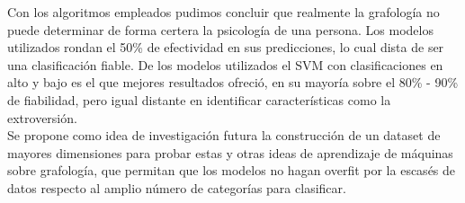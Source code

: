 \documentclass[10pt, a4paper]{article}
\begin{document}
        Con los algoritmos empleados pudimos concluir que realmente la grafolog\'ia no puede determinar de 
        forma certera la psicolog\'ia de una persona. Los modelos utilizados rondan el 50\% de efectividad en sus predicciones, lo cual dista de ser una clasificaci\'on fiable. De los modelos utilizados el SVM con clasificaciones en alto y bajo es el que mejores 
        resultados ofreci\'o, en su mayor\'ia sobre el 80\% - 90\% de fiabilidad, pero igual distante en identificar caracter\'isticas como la extroversi\'on.\\ 

        Se propone como idea de investigaci\'on futura la construcci\'on de un dataset de mayores dimensiones para probar estas y otras ideas de aprendizaje de m\'aquinas sobre grafolog\'ia, que permitan que los modelos no hagan overfit por la escas\'es de datos respecto al amplio n\'umero de categor\'ias para clasificar. 
\end{document}
